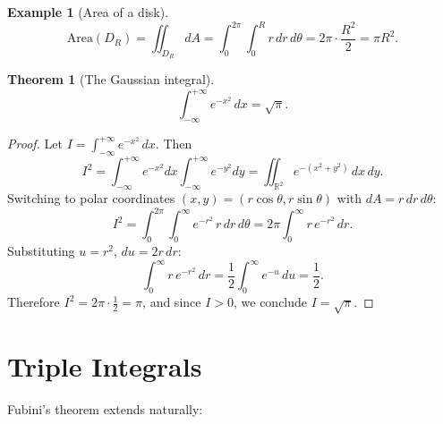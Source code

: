 \documentclass[12pt,a4paper]{book}
\theoremstyle{definition}
\newtheorem{theorem}{Theorem}[chapter]
\newtheorem{example}{Example}[chapter]
\begin{document}
\begin{center}
\label{fig:polar-grid}
\end{center}

\begin{example}[Area of a disk]
\label{ex:area-disk}
\[
  \text{Area}(D_R) = \iint_{D_R}dA
  = \int_0^{2\pi}\int_0^R r\,dr\,d\theta
  = 2\pi\cdot\frac{R^2}{2}=\pi R^2.
\]
\end{example}

\begin{theorem}[The Gaussian integral]
\label{thm:gaussian}
\[
  \int_{-\infty}^{+\infty}e^{-x^2}\,dx = \sqrt{\pi}.
\]
\end{theorem}

\begin{proof}
Let $I=\int_{-\infty}^{+\infty}e^{-x^2}\,dx$.  Then
\[
  I^2 = \int_{-\infty}^{+\infty}e^{-x^2}dx
        \int_{-\infty}^{+\infty}e^{-y^2}dy
  = \iint_{\mathbb{R}^2}e^{-(x^2+y^2)}\,dx\,dy.
\]
Switching to polar coordinates $(x,y)=(r\cos\theta,r\sin\theta)$ with
$dA=r\,dr\,d\theta$:
\[
  I^2 = \int_0^{2\pi}\int_0^{\infty}e^{-r^2}\,r\,dr\,d\theta
  = 2\pi\int_0^{\infty}r\,e^{-r^2}\,dr.
\]
Substituting $u=r^2$, $du=2r\,dr$:
\[
  \int_0^{\infty}r\,e^{-r^2}\,dr = \frac{1}{2}\int_0^{\infty}e^{-u}\,du
  = \frac{1}{2}.
\]
Therefore $I^2=2\pi\cdot\frac{1}{2}=\pi$, and since $I>0$, we conclude
$I=\sqrt{\pi}$.
\end{proof}

\section{Triple Integrals}
\label{sec:triple-integrals}

Fubini's theorem extends naturally:
\end{document}
